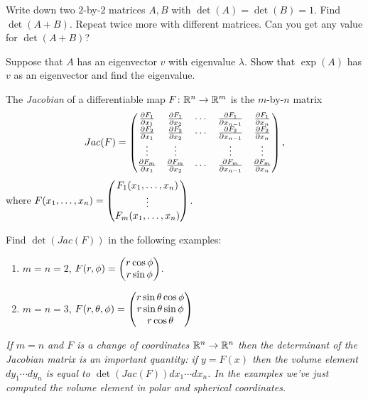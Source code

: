 \documentclass{article}
\begin{document}
\begin{Exercise}\label{exr:detsum}
Write down two \(2\)-by-\(2\) matrices \(A,B\) with
\(\det(A)=\det(B)=1\). Find \(\det(A+B)\). Repeat twice more with
different matrices. Can you get any value for \(\det(A+B)\)?


\end{Exercise}
\begin{Exercise}
Suppose that \(A\) has an eigenvector \(v\) with eigenvalue
\(\lambda\). Show that \(\exp(A)\) has \(v\) as an eigenvector and
find the eigenvalue.


\end{Exercise}
\begin{Exercise}\label{exr:jacobian}
The {\em Jacobian} of a differentiable map \(F\colon\mathbb{R}^n\to\mathbb{R}^m\)
is the \(m\)-by-\(n\) matrix \[Jac(F)=\begin{pmatrix} \frac{\partial
F_1}{\partial x_1} & \frac{\partial F_1}{\partial x_2} & \cdots &
\frac{\partial F_1}{\partial x_{n-1}} & \frac{\partial F_1}{\partial
x_n} \\ \frac{\partial F_2}{\partial x_1} & \frac{\partial
F_2}{\partial x_2} & \cdots & \frac{\partial F_2}{\partial x_{n-1}}
& \frac{\partial F_2}{\partial x_n} \\ \vdots & \vdots & & \vdots &
\vdots \\ \frac{\partial F_m}{\partial x_1} & \frac{\partial
F_m}{\partial x_2} & \cdots &\frac{\partial F_m}{\partial x_{n-1}} &
\frac{\partial F_m}{\partial x_n}\end{pmatrix},\] where
\(F(x_1,\ldots,x_n)=\begin{pmatrix}
F_1(x_1,\ldots,x_n)\\ \vdots\\ F_m(x_1,\ldots,x_n)\end{pmatrix}\).


Find \(\det(Jac(F))\) in the following examples:
\begin{enumerate}
\item \(m=n=2\), \(F(r,\phi)=\begin{pmatrix} r\cos\phi \\ r\sin\phi\end{pmatrix}\).
\item \(m=n=3\), \(F(r,\theta,\phi)=\begin{pmatrix} r\sin\theta\cos\phi
\\ r\sin\theta\sin\phi \\ r\cos\theta\end{pmatrix}\)


\end{enumerate}
{\em If \(m=n\) and \(F\) is a change of coordinates
\(\mathbb{R}^n\to\mathbb{R}^n\) then the determinant of the Jacobian matrix is an
important quantity: if \(y=F(x)\) then the volume element
\(dy_1\cdots dy_n\) is equal to \(\det(Jac(F))dx_1\cdots dx_n\). In
the examples we've just computed the volume element in polar and
spherical coordinates.}


\end{Exercise}
\end{document}

